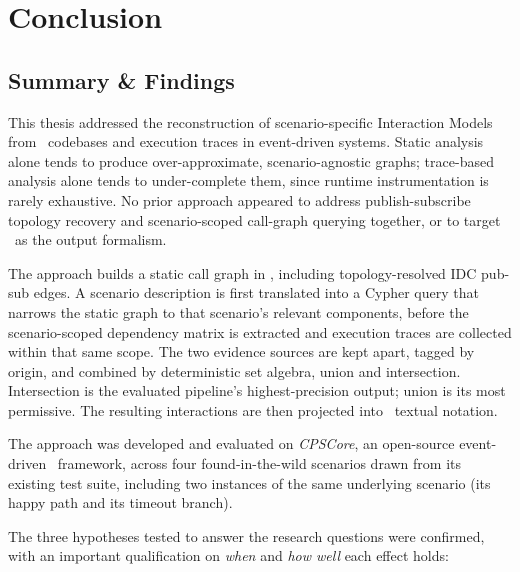 \chapter{Conclusion}\label{ch:conclusion}

\section{Summary \& Findings}

This thesis addressed the reconstruction of scenario-specific Interaction
Models from \Cpp\ codebases and execution traces in event-driven systems.
Static analysis alone tends to produce over-approximate, scenario-agnostic
graphs; trace-based analysis alone tends to under-complete them, since
runtime instrumentation is rarely exhaustive. No prior approach appeared
to address publish-subscribe topology recovery and scenario-scoped
call-graph querying together, or to target \sysml\ as the output
formalism.

The approach builds a static call graph in \neo, including
topology-resolved IDC pub-sub edges. A scenario description is first
translated into a Cypher query that narrows the static graph to that
scenario's relevant components, before the scenario-scoped dependency
matrix is extracted and execution traces are collected within that same
scope. The two evidence sources are kept apart, tagged by origin, and
combined by deterministic set algebra, union and intersection. Intersection is the evaluated
pipeline's highest-precision output; union is its most permissive. The
resulting interactions are then projected into \sysml\ textual notation.

The approach was developed and evaluated on \emph{CPSCore}, an
open-source event-driven \Cpp\ framework, across four found-in-the-wild
scenarios drawn from its existing test suite, including two instances of
the same underlying scenario (its happy path and its timeout branch).

The three hypotheses tested to answer the research questions were
confirmed, with an important qualification on \emph{when} and
\emph{how well} each effect holds:

